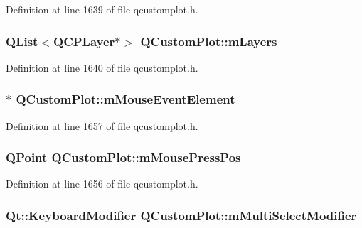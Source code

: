 Definition at line 1639 of file qcustomplot.\-h.

\hypertarget{class_q_custom_plot_a72ee313041b873d76c198793ce7e6c37}{
\subsubsection[{m\-Layers}]{\setlength{\rightskip}{0pt plus 5cm}Q\-List$<${\bf Q\-C\-P\-Layer}$\ast$$>$ Q\-Custom\-Plot\-::m\-Layers\hspace{0.3cm}{\ttfamily [protected]}}}\label{class_q_custom_plot_a72ee313041b873d76c198793ce7e6c37}


Definition at line 1640 of file qcustomplot.\-h.

\hypertarget{class_q_custom_plot_a9ef6aa831ac6c71a058fa84b1d5fb152}{
\subsubsection[{m\-Mouse\-Event\-Element}]{$\ast$ Q\-Custom\-Plot\-::m\-Mouse\-Event\-Element\hspace{0.3cm}{\ttfamily [protected]}}}\label{class_q_custom_plot_a9ef6aa831ac6c71a058fa84b1d5fb152}


Definition at line 1657 of file qcustomplot.\-h.

\hypertarget{class_q_custom_plot_ac57090da95056ae4dd67be67adfa85bd}{
\subsubsection[{m\-Mouse\-Press\-Pos}]{\setlength{\rightskip}{0pt plus 5cm}Q\-Point Q\-Custom\-Plot\-::m\-Mouse\-Press\-Pos\hspace{0.3cm}{\ttfamily [protected]}}}\label{class_q_custom_plot_ac57090da95056ae4dd67be67adfa85bd}


Definition at line 1656 of file qcustomplot.\-h.

\hypertarget{class_q_custom_plot_a0e97e701c5671e7e463d2ce0211d0f8a}{
\subsubsection[{m\-Multi\-Select\-Modifier}]{\setlength{\rightskip}{0pt plus 5cm}Qt\-::\-Keyboard\-Modifier Q\-Custom\-Plot\-::m\-Multi\-Select\-Modifier\hspace{0.3cm}{\ttfamily [protected]}}}\label{class_q_custom_plot_a0e97e701c5671e7e463d2ce0211d0f8a}


